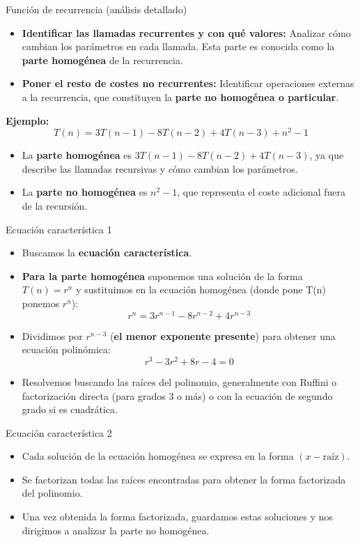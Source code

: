 \documentclass[aspectratio=169]{beamer}
\begin{document}
\begin{frame}{Función de recurrencia (análisis detallado)}
\begin{itemize}
    \item \textbf{Identificar las llamadas recurrentes y con qué valores:} 
    Analizar cómo cambian los parámetros en cada llamada. Esta parte es conocida como la \textbf{parte homogénea} de la recurrencia.
    
    \item \textbf{Poner el resto de costes no recurrentes:} 
    Identificar operaciones externas a la recurrencia, que constituyen la \textbf{parte no homogénea o particular}.
\end{itemize}

\textbf{Ejemplo:}
\[
T(n) = 3T(n-1) - 8T(n-2) + 4T(n-3) + n^2 - 1
\]
\begin{itemize}
    \item La \textbf{parte homogénea} es \( 3T(n-1) - 8T(n-2) + 4T(n-3) \), ya que describe las llamadas recursivas y cómo cambian los parámetros.
    \item La \textbf{parte no homogénea} es \( n^2 - 1 \), que representa el coste adicional fuera de la recursión.
\end{itemize}
\end{frame}

\begin{frame}{Ecuación característica 1}
\begin{itemize}
    \item Buscamos la \textbf{ecuación característica}.
    \item \textbf{Para la parte homogénea} suponemos una solución de la forma \( T(n) = r^n \) y sustituimos en la ecuación homogénea (donde pone T(n) ponemos \( r^n\)):
    \[
    r^n = 3r^{n-1} - 8r^{n-2} + 4r^{n-3}
    \]
    \item Dividimos por \( r^{n-3} \) (\textbf{el menor exponente presente}) para obtener una ecuación polinómica:
    \[
    r^3 - 3r^2 + 8r - 4 = 0
    \]
    \item Resolvemos buscando las raíces del polinomio, generalmente con Ruffini o factorización directa (para grados 3 o más) o con la ecuación de segundo grado si es cuadrática.
\end{itemize}
\end{frame}

\begin{frame}{Ecuación característica 2}
\begin{itemize}
    \item Cada solución de la ecuación homogénea se expresa en la forma \( (x - \text{raíz}) \).
    \item Se factorizan todas las raíces encontradas para obtener la forma factorizada del polinomio.
    \item Una vez obtenida la forma factorizada, guardamos estas soluciones y nos dirigimos a analizar la parte no homogénea.
\end{itemize}
\end{frame}
\end{document}

